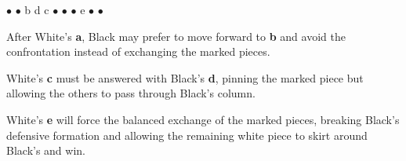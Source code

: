 \documentclass[a4paper,12pt]{article}
\begin{document}
    \begin{minipage}[c]{0.36\linewidth}
        \begin{center}
            \begin{othelloboardnorefs}{0.75}
                \annotationsfirstrow	{} {} {} {} {} {} {$\bullet$} {}
                \annotationssecondrow	{} {$\bullet$} {} {} {} {} {} {}
                 {{\sffamily b}} {} {} {} {} {{\sffamily d}} {{\sffamily c}}
                \annotationsfourthrow	{} {$\bullet$} {} {} {} {} {} {}
                \annotationsfifthrow	{} {} {} {} {} {} {} {}
                \annotationssixthrow	{} {$\bullet$} {} {$\bullet$} {} {} {} {}
                \annotationsseventhrow	{} {} {{\sffamily e}} {} {} {} {} {}
                \annotationseighthrow	{} {$\bullet$} {} {$\bullet$} {} {} {} {}
            \end{othelloboardnorefs}
        \end{center}
    \end{minipage}
    \hfill
    \begin{minipage}[c]{0.62\linewidth}
        After White's \textbf{a}, Black may prefer to move forward to \textbf{b} and avoid the confrontation instead of exchanging the marked pieces.

        White's \textbf{c} must be answered with Black's \textbf{d}, pinning the marked piece but allowing the others to pass through Black's column.

        White's \textbf{e} will force the balanced exchange of the marked pieces, breaking Black's defensive formation and allowing the remaining white piece to skirt around Black's and win.
    \end{minipage}


\newpage
\end{document}
